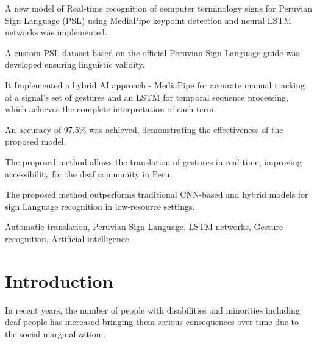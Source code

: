 \documentclass[preprint,12pt,authoryear]{elsarticle}
\begin{document}
\begin{frontmatter}
\begin{highlights}
    \item A new model of Real-time recognition of computer terminology signs for Peruvian Sign Language (PSL) using MediaPipe keypoint detection and neural LSTM networks was implemented.
    \item A custom PSL dataset based on the official Peruvian Sign Language guide was developed ensuring linguistic validity.
    \item It Implemented a hybrid AI approach - MediaPipe for accurate manual tracking of a signal's set of gestures and an LSTM for temporal sequence processing, which achieves the complete interpretation of each term.
    \item An accuracy of 97.5\% was achieved, demonstrating the effectiveness of the proposed model.
    \item The proposed method allows the translation of gestures in real-time, improving accessibility for the deaf community in Peru.
    \item The proposed method outperforms traditional CNN-based and hybrid models for sign Language recognition in low-resource settings.

\end{highlights}

\begin{keyword}


Automatic translation, Peruvian Sign Language, LSTM networks, Gesture recognition, Artificial intelligence
\end{keyword}

\end{frontmatter}



\section{Introduction}
In recent years, the number of people with disabilities and minorities including deaf people has increased bringing them serious consequences over time due to the social marginalization  \cite{Attia}.
\end{document}
